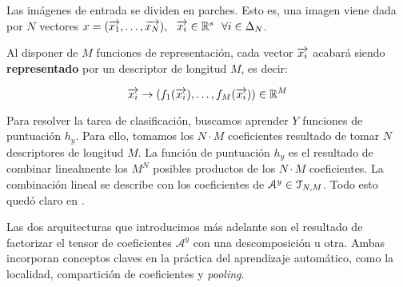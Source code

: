 Las imágenes de entrada se dividen en parches. Esto es, una imagen viene dada por $N$ vectores $x = (\overrightarrow{x_1}, \ldots, \overrightarrow{x_N}), \ \  \overrightarrow{x_i} \in \mathbb{R}^s \ \  \forall i \in \Delta_{N}$.

Al disponer de $M$ funciones de representación, cada vector $\overrightarrow{x_i}$ acabará siendo \textbf{representado} por un descriptor de longitud $M$, es decir:

\begin{equation}
    \overrightarrow{x_i} \to (f_1(\overrightarrow{x_i}), \ldots, f_M(\overrightarrow{x_i})) \in \mathbb{R}^M
\end{equation}

Para resolver la tarea de clasificación, buscamos aprender $Y$ funciones de puntuación $h_y$. Para ello, tomamos los $N \cdot M$ coeficientes resultado de tomar $N$ descriptores de longitud $M$. La función de puntuación $h_y$ es el resultado de combinar linealmente los $M^N$ posibles productos de los $N \cdot M$ coeficientes. La combinación lineal se describe con los coeficientes de $\mathcal{A}^y \in \mathcal{T}_{N, M}$. Todo esto quedó claro en .

Las dos arquitecturas que introducimos más adelante son el resultado de factorizar el tensor de coeficientes $\mathcal{A}^y$ con una descomposición u otra. Ambas incorporan conceptos claves en la práctica del aprendizaje automático, como la localidad, compartición de coeficientes y \textit{pooling}.
